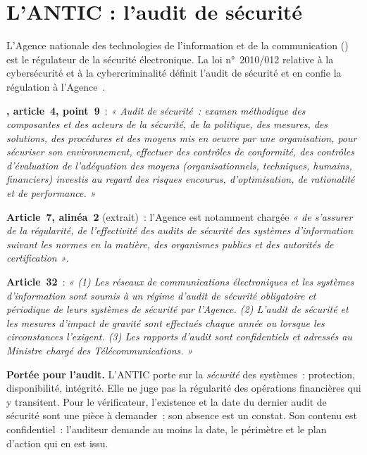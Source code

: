\separateur

\section{L'ANTIC : l'audit de sécurité}
\label{sec:c04-antic}

L'Agence nationale des technologies de l'information et de la
communication () est le régulateur de la sécurité
électronique. La loi n°~2010/012 relative à la cybersécurité et à la
cybercriminalité définit l'audit de sécurité et en confie la régulation à
l'Agence~\cite{loi2010012}.

\begin{boxjuris}
\textbf{, article~4, point~9}~: \textit{« Audit de
sécurité~: examen méthodique des composantes et des acteurs de la
sécurité, de la politique, des mesures, des solutions, des procédures et
des moyens mis en oeuvre par une organisation, pour sécuriser son
environnement, effectuer des contrôles de conformité, des contrôles
d'évaluation de l'adéquation des moyens (organisationnels, techniques,
humains, financiers) investis au regard des risques encourus,
d'optimisation, de rationalité et de performance. »}

\medskip
\textbf{Article~7, alinéa~2} (extrait)~: l'Agence est notamment chargée
\textit{« de s'assurer de la régularité, de l'effectivité des audits de
sécurité des systèmes d'information suivant les normes en la matière, des
organismes publics et des autorités de certification »}.

\medskip
\textbf{Article~32}~: \textit{« (1) Les réseaux de communications
électroniques et les systèmes d'information sont soumis à un régime
d'audit de sécurité obligatoire et périodique de leurs systèmes de
sécurité par l'Agence. (2) L'audit de sécurité et les mesures d'impact de
gravité sont effectués chaque année ou lorsque les circonstances
l'exigent. (3) Les rapports d'audit sont confidentiels et adressés au
Ministre chargé des Télécommunications. »}

\medskip
\textbf{Portée pour l'audit.} L'ANTIC porte sur la \emph{sécurité} des
systèmes~: protection, disponibilité, intégrité. Elle ne juge pas la
régularité des opérations financières qui y transitent. Pour le
vérificateur, l'existence et la date du dernier audit de sécurité sont
une pièce à demander~; son absence est un constat. Son contenu est
confidentiel~: l'auditeur demande au moins la date, le périmètre et le
plan d'action qui en est issu.
\end{boxjuris}

